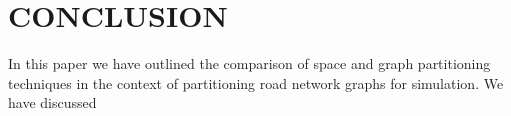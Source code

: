 \section{CONCLUSION}
\label{sec:conc}

In this paper we have outlined the comparison of space and graph partitioning techniques in the context of partitioning road network graphs for simulation. We have discussed 
